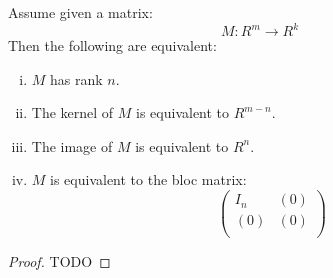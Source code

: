 \begin{lemma}\label{rank-equivalent-definitions}
Assume given a matrix:
\[M : R^m\to R^k\]
Then the following are equivalent:
\begin{enumerate}[(i)]
\item $M$ has rank $n$.
\item The kernel of $M$ is equivalent to $R^{m-n}$.
\item The image of $M$ is equivalent to $R^n$.
\item $M$ is equivalent to the bloc matrix:
\[\begin{pmatrix}
I_n & (0)  \\
(0) & (0) \\
\end{pmatrix}\]
\end{enumerate}
\end{lemma}

\begin{proof}
TODO
\end{proof}





